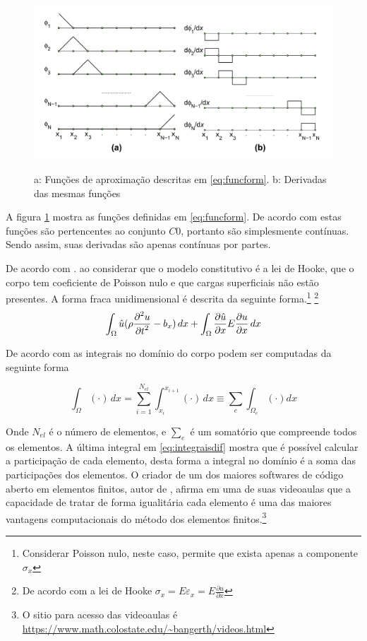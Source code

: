 \begin{figure}[h] %
    \centering
    \caption{ a: Funções de aproximação descritas em \ref{eq:funcform}. b: Derivadas das mesmas funções }
    \includegraphics[width=0.8\linewidth]{images/funcform.png}
    \label{fig:funcform}
\end{figure}

A figura \ref{fig:funcform} mostra as funções definidas em \ref{eq:funcform}. De acordo com \cite{zienkiewicz2013} estas funções são pertencentes ao conjunto $C0$, portanto são simplesmente contínuas. Sendo assim, suas derivadas são apenas contínuas por partes.

De acordo com \cite{zienkiewicz2013}. ao considerar que o modelo constitutivo é a lei de Hooke, que o corpo tem coeficiente de Poisson nulo e que cargas superficiais não estão presentes. A forma fraca unidimensional é descrita da seguinte forma.\footnote{Considerar Poisson nulo, neste caso, permite que exista apenas a componente $ \sigma_x $} \footnote{De acordo com a lei de Hooke $ \sigma_x = E \varepsilon_x = E \frac{\partial u}{ \partial x} $}
\begin{equation} \label{eq:formafracalin}
    \int_{\Omega} \hat{u} (\rho \frac{\displaystyle \partial^2 u}{\displaystyle \partial t^2} - b_x) \, dx + \int_{\Omega} \frac{\displaystyle \partial \hat{u}}{\displaystyle \partial x} E \frac{\displaystyle \partial u}{\displaystyle  \partial x} \,  dx
\end{equation}

De acordo com \cite{zienkiewicz2013}  as integrais no domínio do corpo podem ser computadas da seguinte forma

\begin{equation} \label{eq:integraisdif}
    \int_{\Omega} (\cdot) \, dx = \sum_{i = 1}^{N_{el}} \int_{x_i}^{x_{i+1}} (\cdot) \, dx \equiv \sum_{e} \int_{\Omega_e} (\cdot) dx
\end{equation}

Onde $ N_{el} $ é o número de elementos, e $\sum_e$ é um somatório que compreende todos os elementos. A última integral em \ref{eq:integraisdif} mostra que é possível calcular a participação de cada elemento, desta forma a integral no domínio é a soma das participações dos elementos. O criador de um dos maiores softwares de código aberto em elementos finitos, autor de  \cite{BangerthHartmannKanschat2007}, afirma em uma de suas videoaulas que a capacidade de tratar de forma igualitária cada elemento é uma das maiores vantagens computacionais do método dos elementos finitos.\footnote{O sitio para acesso das videoaulas é \url{https://www.math.colostate.edu/~bangerth/videos.html}} \\

